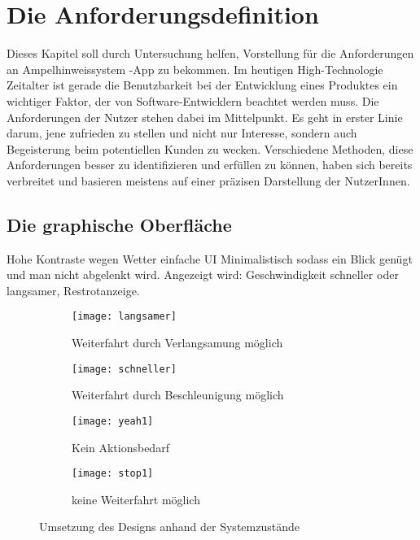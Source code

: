 \chapter{Die Anforderungsdefinition}
Dieses Kapitel soll durch Untersuchung helfen, Vorstellung für die Anforderungen an Ampelhinweissystem -App zu bekommen. 
Im heutigen High-Technologie Zeitalter ist gerade die Benutzbarkeit bei der Entwicklung eines Produktes ein wichtiger Faktor, der von Software-Entwicklern beachtet werden muss. Die Anforderungen der Nutzer stehen dabei im Mittelpunkt. Es geht in erster Linie darum, jene zufrieden zu stellen und nicht nur Interesse, sondern auch Begeisterung beim potentiellen Kunden zu wecken. Verschiedene Methoden, diese Anforderungen besser zu identifizieren und erfüllen zu können, haben sich bereits verbreitet und basieren meistens auf einer präzisen Darstellung der NutzerInnen.
\section{Die graphische Oberfläche}

Hohe Kontraste wegen Wetter
einfache UI 
Minimalistisch sodass ein Blick genügt und man nicht abgelenkt wird.
Angezeigt wird: Geschwindigkeit schneller oder langsamer, 
Restrotanzeige.
\begin{figure}[H]
        \centering
        \begin{subfigure}[t]{0.36\textwidth}
                \texttt{[image: langsamer]}
                \caption[Systemzustand a]{Weiterfahrt durch Verlangsamung möglich}
                \label{fig:langsamer}
        \end{subfigure}
        \hfill
        \begin{subfigure}[t]{0.36\textwidth}
                \texttt{[image: schneller]}
                \caption[Systemzustand b]{Weiterfahrt durch Beschleunigung möglich}
                \label{fig:schneller}
        \end{subfigure}
        \begin{subfigure}[t]{0.36\textwidth}
                \texttt{[image: yeah1]}
                \caption[Systemzustand c]{Kein Aktionsbedarf}
                \label{fig:langsamer}
        \end{subfigure}
        \hfill 
        \begin{subfigure}[t]{0.36\textwidth}
                \texttt{[image: stop1]}
                \caption[Systemzustand s]{keine Weiterfahrt möglich}
                \label{fig:schneller}
        \end{subfigure}
        \caption[Systemzustände im Ampelbereich]{Umsetzung des Designs anhand der Systemzustände}
        \label{fig:szenario_mockup}
\end{figure} 

